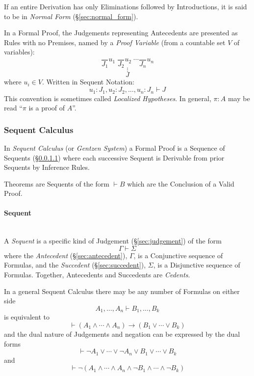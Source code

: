 If an entire Derivation has only Eliminations followed by
Introductions, it is said to be in \emph{Normal Form}
(\S\ref{sec:normal_form}).

In a Formal Proof, the Judgements representing Antecedents are
presented as Rules with no Premises, named by a \emph{Proof Variable}
(from a countable set $V$ of variables):
\[
  \frac{}{J_1}u_1 \; \frac{}{J_2}u_2 \; \cdots \frac{}{J_n}u_n
\]\[
  \vdots
\]\[
  J
\]
where $u_i \in V$. Written in Sequent Notation:
\[
  u_1:J_1, u_2:J_2, \ldots, u_n:J_n \vdash J
\]
This convention is sometimes called \emph{Localized Hypotheses}. In
general, $\pi : A$ may be read ``$\pi$ is a proof of $A$''.



\subsubsection{Sequent Calculus}\label{sec:sequent_calculus}

In \emph{Sequent Calculus} (or \emph{Gentzen System}) a Formal Proof
is a Sequence of Sequents (\S\ref{sec:sequent}) where each
successive Sequent is Derivable from prior Sequents by Inference
Rules.

Theorems are Sequents of the form $\vdash B$ which are the Conclusion
of a Valid Proof.



\paragraph{Sequent}\label{sec:sequent}
\hfill \\

A \emph{Sequent} is a specific kind of Judgement
(\S\ref{sec:judgement}) of the form
\[
  \Gamma \vdash \Sigma
\]
where the \emph{Antecedent} (\S\ref{sec:antecedent}), $\Gamma$, is a
Conjunctive sequence of Formulas, and the \emph{Succedent}
(\S\ref{sec:succedent}), $\Sigma$, is a Disjunctive sequence of
Formulas. Together, Antecedents and Succedents are \emph{Cedents}.

In a general Sequent Calculus there may be any number of Formulas on
either side
\[
  A_1, \ldots, A_n \vdash B_1, \ldots, B_k
\]
is equivalent to
\[
  \vdash(A_1 \wedge \cdots \wedge A_n) \rightarrow
  (B_1 \vee \cdots \vee B_k)
\]
and the dual nature of Judgements and negation can be expressed by the
dual forms
\[
  \vdash \neg A_1 \vee \cdots \vee \neg A_n \vee B_1 \vee \cdots
  \vee B_k
\]
and
\[
  \vdash \neg(A_1 \wedge \cdots \wedge A_n \wedge \neg B_1 \wedge
  \cdots \wedge \neg B_k)
\]

